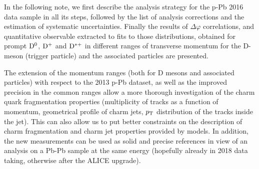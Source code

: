 In the following note, we first describe the analysis strategy for the p-Pb 2016 data sample in all its steps, followed by the list of analysis corrections and the estimation of systematic uncertainties. Finally the results of $\Delta\varphi$ correlations, and quantitative observable extracted to fits to those distributions, obtained for prompt $\rm{D^0}$, $\rm{D^{+}}$ and $\rm{D^{*+}}$ in different ranges of transverse momentum for the D-meson (trigger particle) and the associated particles are presented.

The extension of the momentum ranges (both for D mesons and associated particles) with respect to the 2013 p-Pb dataset, as well as the improved precision in the common ranges allow a more thorough investigation of the charm quark fragmentation properties (multiplicity of tracks as a function of momentum, geometrical profile of charm jets, $p_{\rm T}$ distribution of the tracks inside the jet). This can also allow us to put better constraints on the description of charm fragmentation and charm jet properties provided by models.
In addition, the new measurements can be used as solid and precise references in view of an analysis on a Pb-Pb sample at the same energy (hopefully already in 2018 data taking, otherwise after the ALICE upgrade).
